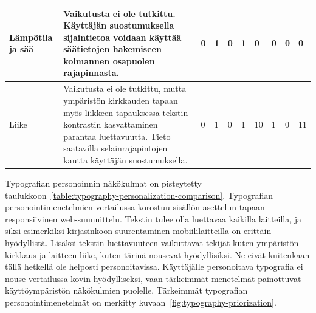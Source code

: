 \documentclass[finnish, 12pt, a4paper, elec, utf8, a-1b, online]{aaltothesis}
\begin{document}
{\begin{longtable}{p{2.5cm}|p{6cm}|p{0.5cm}p{0.5cm}p{0.5cm}|p{0.5cm}|p{0.5cm}p{0.5cm}p{0.5cm}|p{0.5cm}|}
    \midrule
    Lämpötila ja sää                       & Vaikutusta ei ole tutkittu. Käyttäjän suostumuksella sijaintietoa voidaan käyttää säätietojen hakemiseen kolmannen osapuolen rajapinnasta.                                                                                                                    & 0                                          & 1                                   & 0                                      & 1                            & 0                                               & 0                                         & 0                                         & 0                            \\
    \midrule
    Liike                                  & Vaikutusta ei ole tutkittu, mutta ympäristön kirkkauden tapaan myös liikkeen tapauksessa tekstin kontrastin kasvattaminen parantaa luettavuutta. Tieto saatavilla selainrajapintojen kautta käyttäjän suostumuksella.                                         & 0                                          & 1                                   & 0                                      & 1                            & 10                                              & 1                                         & 0                                         & 11                           \\
\end{longtable}
}

Typografian personoinnin näkökulmat on pisteytetty
taulukkoon~\ref{table:typography-personalization-comparison}. Typografian
personointimenetelmien vertailussa korostuu sisällön asettelun tapaan
responsiivinen web-suunnittelu. Tekstin tulee olla luettavaa kaikilla
laitteilla, ja siksi esimerkiksi kirjasinkoon suurentaminen mobiililaitteilla on
erittäin hyödyllistä. Lisäksi tekstin luettavuuteen vaikuttavat tekijät kuten
ympäristön kirkkaus ja laitteen liike, kuten tärinä nousevat hyödyllisiksi. Ne
eivät kuitenkaan tällä hetkellä ole helposti personoitavissa. Käyttäjälle
personoitava typografia ei nouse vertailussa kovin hyödylliseksi, vaan
tärkeimmät menetelmät painottuvat käyttöympäristön näkökulmien puolelle.
Tärkeimmät typografian personointimenetelmät on merkitty
kuvaan~\ref{fig:typography-priorization}.
\end{document}

